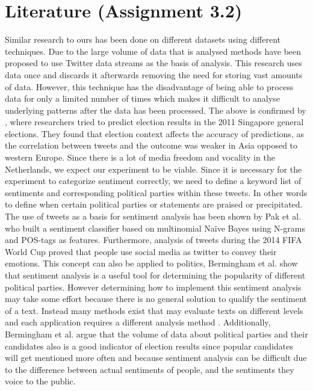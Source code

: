 \documentclass[a4paper]{report}
\begin{document}
\section*{Literature (Assignment 3.2)}
Similar research to ours has been done on different datasets using different techniques. Due to the large volume of data that is analysed methods have been proposed to use Twitter data streams \cite{wang2012system} as the basis of analysis. This research uses data once and discards it afterwards removing the need for storing vast amounts of data. However, this technique has the disadvantage of being able to process data for only a limited number of times which makes it difficult to analyse underlying patterns after the data has been processed. The above is confirmed by \cite{skoric2012tweets}, where researchers tried to predict election results in the 2011 Singapore general elections. They found that election context affects the accuracy of predictions, as the correlation between tweets and the outcome was weaker in Asia opposed to western Europe. Since there is a lot of media freedom and vocality in the Netherlands, we expect our experiment to be viable. Since it is necessary for the experiment to categorize sentiment correctly, we need to define a keyword list of sentiments and corresponding political parties within these tweets. In other words to define when certain political parties or statements are praised or precipitated. The use of tweets as a basis for sentiment analysis has been shown by Pak et al. \cite{pak2010twitter} who built a sentiment classifier based on multinomial Naïve Bayes using N-grams and POS-tags as features. Furthermore, analysis of tweets during the 2014 FIFA World Cup \cite{yu2015world} proved that people use social media as twitter to convey their emotions. This concept can also be applied to politics, Bermingham et al. \cite{bermingham2011using} show that sentiment analysis is a useful tool for determining the popularity of different political parties. However determining how to implement this sentiment analysis may take some effort because there is no general solution to qualify the sentiment of a text. Instead many methods exist that may evaluate texts on different levels and each application requires a different analysis method \cite{liu2012sentiment}. Additionally, Bermingham et al. argue that the volume of data about political parties and their candidates also is a good indicator of election results since popular candidates will get mentioned more often and because sentiment analysis can be difficult due to the difference between actual sentiments of people, and the sentiments they voice to the public.
\end{document}
